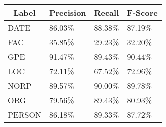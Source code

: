 \begin{tabular}{@{}llll@{}}
\toprule
\multicolumn{1}{c}{Label} & \multicolumn{1}{c}{Precision} & \multicolumn{1}{c}{Recall} & \multicolumn{1}{c}{F-Score} \\ \midrule
DATE                      & 86.03\%                       & 88.38\%                    & 87.19\%                     \\
FAC                       & 35.85\%                       & 29.23\%                    & 32.20\%                     \\
GPE                       & 91.47\%                       & 89.43\%                    & 90.44\%                     \\
LOC                       & 72.11\%                       & 67.52\%                    & 72.96\%                     \\
NORP                      & 89.57\%                       & 90.00\%                    & 89.78\%                     \\
ORG                       & 79.56\%                       & 89.43\%                    & 80.93\%                     \\
PERSON                    & 86.18\%                       & 89.33\%                    & 87.72\%                     \\ \bottomrule
\end{tabular}